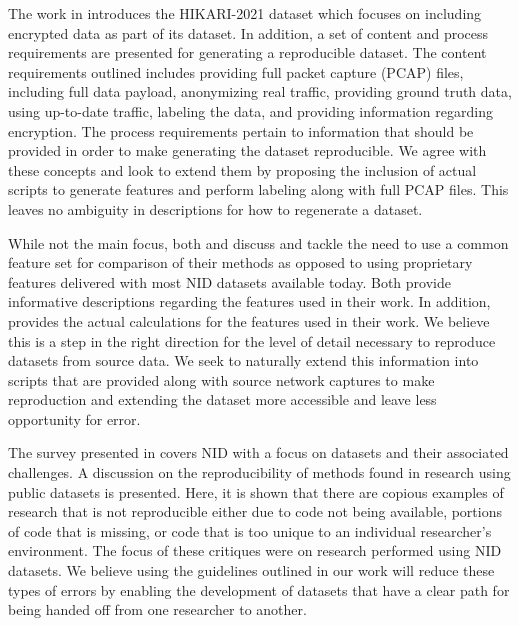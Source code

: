 \documentclass[sigconf, anonymous, screen, review]{acmart}
\begin{document}
The work in \cite{ferriyan2021} introduces the HIKARI-2021 dataset which focuses on including encrypted data as part of its dataset.
In addition, a set of content and process requirements are presented for generating a reproducible dataset.
The content requirements outlined includes providing full packet capture (PCAP) files, including full data payload, anonymizing real traffic,  providing ground truth data, using up-to-date traffic, labeling the data, and providing information regarding encryption.
The process requirements pertain to information that should be provided in order to make generating the dataset reproducible.
We agree with these concepts and look to extend them by proposing the inclusion of actual scripts to generate features and perform labeling along with full PCAP files.
This leaves no ambiguity in descriptions for how to regenerate a dataset.

While not the main focus, both \cite{e23111532} and \cite{layeghy2021} discuss and tackle the need to use a common feature set for comparison of their methods as opposed to using proprietary features delivered with most NID datasets available today.
Both provide informative descriptions regarding the features used in their work.
In addition, \cite{layeghy2021} provides the actual calculations for the features used in their work.
We believe this is a step in the right direction for the level of detail necessary to reproduce datasets from source data. 
We seek to naturally extend this information into scripts that are provided along with source network captures to make reproduction and extending the dataset more accessible and leave less opportunity for error.

The survey presented in \cite{Chou2022} covers NID with a focus on datasets and their associated challenges.
A discussion on the reproducibility of methods found in research using public datasets is presented.
Here, it is shown that there are copious examples of research that is not reproducible either due to code not being available, portions of code that is missing, or code that is too unique to an individual researcher's environment.
The focus of these critiques were on research performed using NID datasets.
We believe using the guidelines outlined in our work will reduce these types of errors by enabling the development of datasets that have a clear path for being handed off from one researcher to another.
\end{document}

